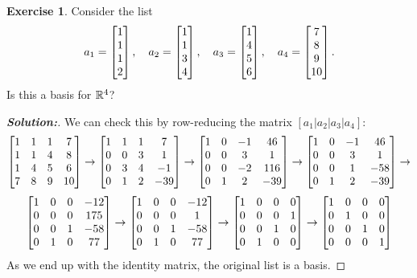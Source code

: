 \documentclass[a4paper]{amsart}
\theoremstyle{definition}
\newtheorem{exercise}{Exercise}
\newenvironment{solution}{\begin{proof}[\textbf{Solution:}] \vphantom{u}}{\end{proof}}
\begin{document}
\begin{exercise}\label{ex-basis-ii}
 Consider the list 
 \[ 
  a_1 = \left[\begin{matrix} 1\\1\\1\\2 \end{matrix}\right], \quad
  a_2 = \left[\begin{matrix} 1\\1\\3\\4 \end{matrix}\right], \quad
  a_3 = \left[\begin{matrix} 1\\4\\5\\6 \end{matrix}\right], \quad
  a_4 = \left[\begin{matrix} 7\\8\\9\\10\end{matrix}\right].
 \]
 Is this a basis for ${\mathbb{R}}^4$?
\end{exercise}
\begin{solution}
 We can check this by row-reducing the matrix $[a_1|a_2|a_3|a_4]$:
 \[ 
  \left[\begin{matrix} 1 & 1 & 1 & 7 \\ 
       1 & 1 & 4 & 8 \\
       1 & 4 & 5 & 6 \\
       7 & 8 & 9 & 10 \end{matrix}\right] 
  \to 
  \left[\begin{matrix} 1 & 1 & 1 &   7 \\ 
       0 & 0 & 3 &   1 \\
       0 & 3 & 4 &  -1 \\
       0 & 1 & 2 & -39 \end{matrix}\right] 
  \to 
  \left[\begin{matrix} 1 & 0 &-1 &  46 \\ 
       0 & 0 & 3 &   1 \\
       0 & 0 &-2 & 116 \\
       0 & 1 & 2 & -39 \end{matrix}\right] 
  \to 
  \left[\begin{matrix} 1 & 0 &-1 &  46 \\ 
       0 & 0 & 3 &   1 \\
       0 & 0 & 1 & -58 \\
       0 & 1 & 2 & -39 \end{matrix}\right] 
  \to 
 \] \[
  \left[\begin{matrix} 1 & 0 & 0 & -12 \\ 
       0 & 0 & 0 & 175 \\
       0 & 0 & 1 & -58 \\
       0 & 1 & 0 &  77 \end{matrix}\right] 
  \to 
  \left[\begin{matrix} 1 & 0 & 0 & -12 \\ 
       0 & 0 & 0 &   1 \\
       0 & 0 & 1 & -58 \\
       0 & 1 & 0 &  77 \end{matrix}\right] 
  \to 
  \left[\begin{matrix} 1 & 0 & 0 &   0 \\ 
       0 & 0 & 0 &   1 \\
       0 & 0 & 1 &   0 \\
       0 & 1 & 0 &   0 \end{matrix}\right] 
  \to 
  \left[\begin{matrix} 1 & 0 & 0 &   0 \\ 
       0 & 1 & 0 &   0 \\
       0 & 0 & 1 &   0 \\
       0 & 0 & 0 &   1 \end{matrix}\right]
 \]
 As we end up with the identity matrix, the original list is a basis.
\end{solution}
\end{document}
